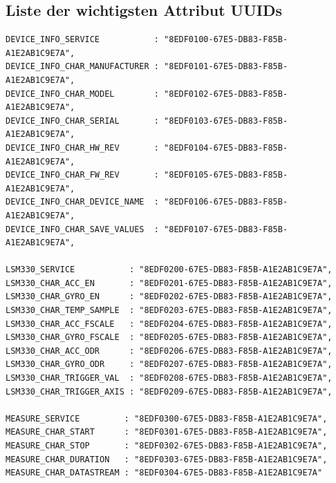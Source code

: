 \subsection{Liste der wichtigsten Attribut UUIDs}
\begin{lstlisting}
DEVICE_INFO_SERVICE           : "8EDF0100-67E5-DB83-F85B-A1E2AB1C9E7A",
DEVICE_INFO_CHAR_MANUFACTURER : "8EDF0101-67E5-DB83-F85B-A1E2AB1C9E7A",
DEVICE_INFO_CHAR_MODEL        : "8EDF0102-67E5-DB83-F85B-A1E2AB1C9E7A",
DEVICE_INFO_CHAR_SERIAL       : "8EDF0103-67E5-DB83-F85B-A1E2AB1C9E7A",
DEVICE_INFO_CHAR_HW_REV       : "8EDF0104-67E5-DB83-F85B-A1E2AB1C9E7A",
DEVICE_INFO_CHAR_FW_REV       : "8EDF0105-67E5-DB83-F85B-A1E2AB1C9E7A",
DEVICE_INFO_CHAR_DEVICE_NAME  : "8EDF0106-67E5-DB83-F85B-A1E2AB1C9E7A",
DEVICE_INFO_CHAR_SAVE_VALUES  : "8EDF0107-67E5-DB83-F85B-A1E2AB1C9E7A",

LSM330_SERVICE           : "8EDF0200-67E5-DB83-F85B-A1E2AB1C9E7A",
LSM330_CHAR_ACC_EN       : "8EDF0201-67E5-DB83-F85B-A1E2AB1C9E7A",
LSM330_CHAR_GYRO_EN      : "8EDF0202-67E5-DB83-F85B-A1E2AB1C9E7A",
LSM330_CHAR_TEMP_SAMPLE  : "8EDF0203-67E5-DB83-F85B-A1E2AB1C9E7A",
LSM330_CHAR_ACC_FSCALE   : "8EDF0204-67E5-DB83-F85B-A1E2AB1C9E7A",
LSM330_CHAR_GYRO_FSCALE  : "8EDF0205-67E5-DB83-F85B-A1E2AB1C9E7A",
LSM330_CHAR_ACC_ODR      : "8EDF0206-67E5-DB83-F85B-A1E2AB1C9E7A",
LSM330_CHAR_GYRO_ODR     : "8EDF0207-67E5-DB83-F85B-A1E2AB1C9E7A",
LSM330_CHAR_TRIGGER_VAL  : "8EDF0208-67E5-DB83-F85B-A1E2AB1C9E7A",
LSM330_CHAR_TRIGGER_AXIS : "8EDF0209-67E5-DB83-F85B-A1E2AB1C9E7A",

MEASURE_SERVICE         : "8EDF0300-67E5-DB83-F85B-A1E2AB1C9E7A",
MEASURE_CHAR_START      : "8EDF0301-67E5-DB83-F85B-A1E2AB1C9E7A",
MEASURE_CHAR_STOP       : "8EDF0302-67E5-DB83-F85B-A1E2AB1C9E7A",
MEASURE_CHAR_DURATION   : "8EDF0303-67E5-DB83-F85B-A1E2AB1C9E7A",
MEASURE_CHAR_DATASTREAM : "8EDF0304-67E5-DB83-F85B-A1E2AB1C9E7A"
\end{lstlisting}
